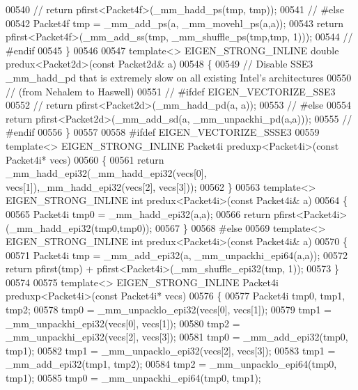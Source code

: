 \begin{DoxyCode}
00540 \textcolor{comment}{//   return pfirst<Packet4f>(\_mm\_hadd\_ps(tmp, tmp));}
00541 \textcolor{comment}{// #else}
00542   Packet4f tmp = \_mm\_add\_ps(a, \_mm\_movehl\_ps(a,a));
00543   \textcolor{keywordflow}{return} pfirst<Packet4f>(\_mm\_add\_ss(tmp, \_mm\_shuffle\_ps(tmp,tmp, 1)));
00544 \textcolor{comment}{// #endif}
00545 \}
00546 
00547 \textcolor{keyword}{template}<> EIGEN\_STRONG\_INLINE \textcolor{keywordtype}{double} predux<Packet2d>(\textcolor{keyword}{const} Packet2d& a)
00548 \{
00549   \textcolor{comment}{// Disable SSE3 \_mm\_hadd\_pd that is extremely slow on all existing Intel's architectures}
00550   \textcolor{comment}{// (from Nehalem to Haswell)}
00551 \textcolor{comment}{// #ifdef EIGEN\_VECTORIZE\_SSE3}
00552 \textcolor{comment}{//   return pfirst<Packet2d>(\_mm\_hadd\_pd(a, a));}
00553 \textcolor{comment}{// #else}
00554   \textcolor{keywordflow}{return} pfirst<Packet2d>(\_mm\_add\_sd(a, \_mm\_unpackhi\_pd(a,a)));
00555 \textcolor{comment}{// #endif}
00556 \}
00557 
00558 \textcolor{preprocessor}{#ifdef EIGEN\_VECTORIZE\_SSSE3}
00559 \textcolor{keyword}{template}<> EIGEN\_STRONG\_INLINE Packet4i preduxp<Packet4i>(\textcolor{keyword}{const} Packet4i* vecs)
00560 \{
00561   \textcolor{keywordflow}{return} \_mm\_hadd\_epi32(\_mm\_hadd\_epi32(vecs[0], vecs[1]),\_mm\_hadd\_epi32(vecs[2], vecs[3]));
00562 \}
00563 \textcolor{keyword}{template}<> EIGEN\_STRONG\_INLINE \textcolor{keywordtype}{int} predux<Packet4i>(\textcolor{keyword}{const} Packet4i& a)
00564 \{
00565   Packet4i tmp0 = \_mm\_hadd\_epi32(a,a);
00566   \textcolor{keywordflow}{return} pfirst<Packet4i>(\_mm\_hadd\_epi32(tmp0,tmp0));
00567 \}
00568 \textcolor{preprocessor}{#else}
00569 \textcolor{keyword}{template}<> EIGEN\_STRONG\_INLINE \textcolor{keywordtype}{int} predux<Packet4i>(\textcolor{keyword}{const} Packet4i& a)
00570 \{
00571   Packet4i tmp = \_mm\_add\_epi32(a, \_mm\_unpackhi\_epi64(a,a));
00572   \textcolor{keywordflow}{return} pfirst(tmp) + pfirst<Packet4i>(\_mm\_shuffle\_epi32(tmp, 1));
00573 \}
00574 
00575 \textcolor{keyword}{template}<> EIGEN\_STRONG\_INLINE Packet4i preduxp<Packet4i>(\textcolor{keyword}{const} Packet4i* vecs)
00576 \{
00577   Packet4i tmp0, tmp1, tmp2;
00578   tmp0 = \_mm\_unpacklo\_epi32(vecs[0], vecs[1]);
00579   tmp1 = \_mm\_unpackhi\_epi32(vecs[0], vecs[1]);
00580   tmp2 = \_mm\_unpackhi\_epi32(vecs[2], vecs[3]);
00581   tmp0 = \_mm\_add\_epi32(tmp0, tmp1);
00582   tmp1 = \_mm\_unpacklo\_epi32(vecs[2], vecs[3]);
00583   tmp1 = \_mm\_add\_epi32(tmp1, tmp2);
00584   tmp2 = \_mm\_unpacklo\_epi64(tmp0, tmp1);
00585   tmp0 = \_mm\_unpackhi\_epi64(tmp0, tmp1);

\end{DoxyCode}
